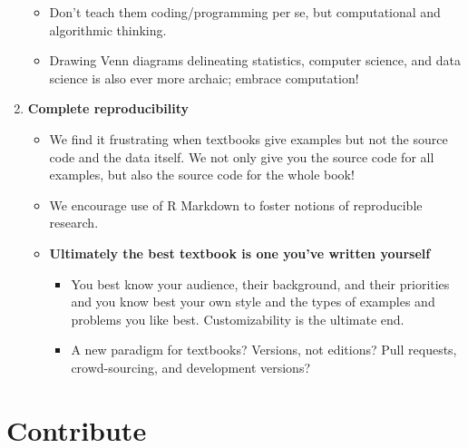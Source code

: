 \documentclass[]{tufte-book}
\providecommand{\tightlist}{%
  \setlength{\itemsep}{0pt}\setlength{\parskip}{0pt}}
\begin{document}
\begin{enumerate}
  \begin{itemize}
  \tightlist
  \item
    Don't teach them coding/programming per se, but computational and
    algorithmic thinking.
  \item
    Drawing Venn diagrams delineating statistics, computer science, and
    data science is also ever more archaic; embrace computation!
  \end{itemize}
\item
  \textbf{Complete reproducibility}

  \begin{itemize}
  \tightlist
  \item
    We find it frustrating when textbooks give examples but not the
    source code and the data itself. We not only give you the source
    code for all examples, but also the source code for the whole book!
  \item
    We encourage use of R Markdown to foster notions of reproducible
    research.
  \item
    \textbf{Ultimately the best textbook is one you've written yourself}

    \begin{itemize}
    \tightlist
    \item
      You best know your audience, their background, and their
      priorities and you know best your own style and the types of
      examples and problems you like best. Customizability is the
      ultimate end.
    \item
      A new paradigm for textbooks? Versions, not editions? Pull
      requests, crowd-sourcing, and development versions?
    \end{itemize}
  \end{itemize}
\end{enumerate}

\section{Contribute}\label{contribute}
\end{document}
